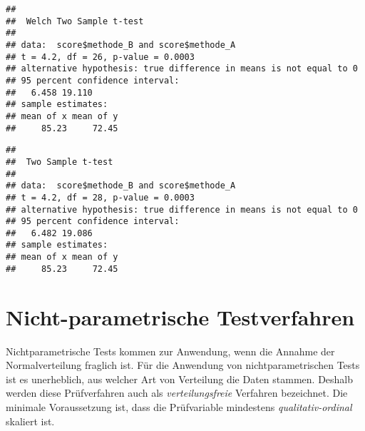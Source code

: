 \documentclass[
]{book}
\newenvironment{Shaded}{\begin{snugshade}}{\end{snugshade}}
\newcommand{\AttributeTok}[1]{\textcolor[rgb]{0.77,0.63,0.00}{#1}}
\newcommand{\CommentTok}[1]{\textcolor[rgb]{0.56,0.35,0.01}{\textit{#1}}}
\newcommand{\ConstantTok}[1]{\textcolor[rgb]{0.00,0.00,0.00}{#1}}
\newcommand{\FunctionTok}[1]{\textcolor[rgb]{0.00,0.00,0.00}{#1}}
\newcommand{\NormalTok}[1]{#1}
\newcommand{\SpecialCharTok}[1]{\textcolor[rgb]{0.00,0.00,0.00}{#1}}
\begin{document}
\begin{Shaded}
\end{Shaded}

\begin{verbatim}
## 
##  Welch Two Sample t-test
## 
## data:  score$methode_B and score$methode_A
## t = 4.2, df = 26, p-value = 0.0003
## alternative hypothesis: true difference in means is not equal to 0
## 95 percent confidence interval:
##   6.458 19.110
## sample estimates:
## mean of x mean of y 
##     85.23     72.45
\end{verbatim}

\begin{Shaded}
\end{Shaded}

\begin{verbatim}
## 
##  Two Sample t-test
## 
## data:  score$methode_B and score$methode_A
## t = 4.2, df = 28, p-value = 0.0003
## alternative hypothesis: true difference in means is not equal to 0
## 95 percent confidence interval:
##   6.482 19.086
## sample estimates:
## mean of x mean of y 
##     85.23     72.45
\end{verbatim}

\hypertarget{nicht-parametrische-testverfahren}{%
\section{Nicht-parametrische Testverfahren}\label{nicht-parametrische-testverfahren}}

Nichtparametrische Tests kommen zur Anwendung, wenn die Annahme der Normalverteilung fraglich ist. Für die Anwendung von nichtparametrischen Tests ist es unerheblich, aus welcher Art von Verteilung die Daten stammen. Deshalb werden diese Prüfverfahren auch als \emph{verteilungsfreie} Verfahren bezeichnet. Die minimale Voraussetzung ist, dass die Prüfvariable mindestens \emph{qualitativ-ordinal} skaliert ist.
\end{document}
